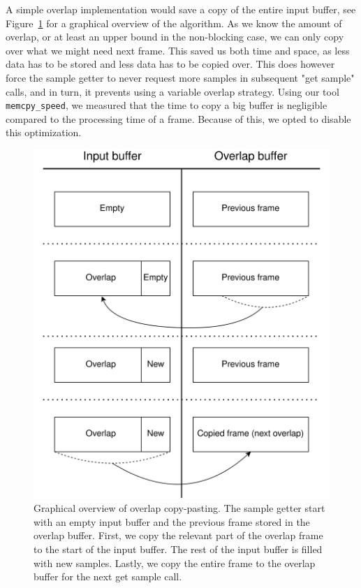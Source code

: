 \documentclass[a4paper,10pt,twocolumn]{article}
\begin{document}
A simple overlap implementation would save a copy of the entire input buffer, see Figure~\ref{fig:overlapgraph} for a graphical overview of the algorithm. As we know the amount of overlap, or at least an upper bound in the non-blocking case, we can only copy over what we might need next frame. This saved us both time and space, as less data has to be stored and less data has to be copied over. This does however force the sample getter to never request more samples in subsequent "get sample" calls, and in turn, it prevents using a variable overlap strategy. Using our tool \texttt{memcpy\_speed}, we measured that the time to copy a big buffer is negligible compared to the processing time of a frame. Because of this, we opted to disable this optimization.%
%
\begin{figure}[h]
    \centering
    \includegraphics[width=0.9\linewidth]{fig/overlap3.png}
    \caption{Graphical overview of overlap copy-pasting. The sample getter start with an empty input buffer and the previous frame stored in the overlap buffer. First, we copy the relevant part of the overlap frame to the start of the input buffer. The rest of the input buffer is filled with new samples. Lastly, we copy the entire frame to the overlap buffer for the next get sample call.}
    \label{fig:overlapgraph}
\end{figure}
\end{document}

